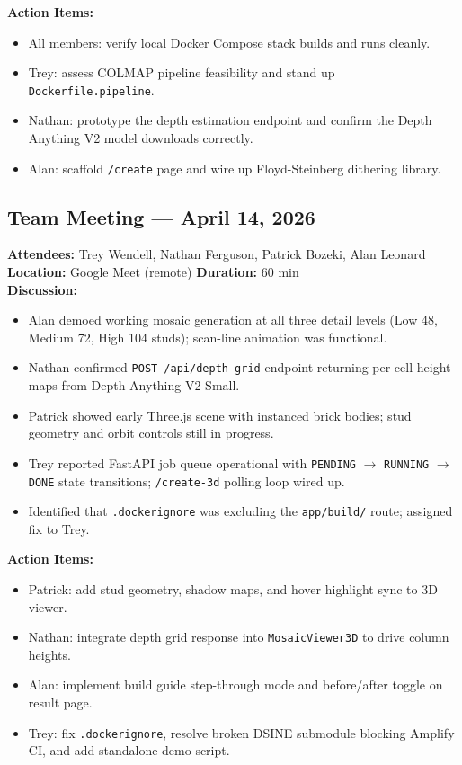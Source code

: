 \documentclass[12pt]{article}
\begin{document}
\textbf{Action Items:}
\begin{itemize}[leftmargin=*]
    \item All members: verify local Docker Compose stack builds and runs cleanly.
    \item Trey: assess COLMAP pipeline feasibility and stand up \texttt{Dockerfile.pipeline}.
    \item Nathan: prototype the depth estimation endpoint and confirm the Depth Anything V2 model downloads correctly.
    \item Alan: scaffold \texttt{/create} page and wire up Floyd-Steinberg dithering library.
\end{itemize}

\vspace{1em}
\subsection{Team Meeting --- April 14, 2026}

\textbf{Attendees:} Trey Wendell, Nathan Ferguson, Patrick Bozeki, Alan Leonard\\
\textbf{Location:} Google Meet (remote) \quad \textbf{Duration:} 60 min\\[0.5em]

\textbf{Discussion:}
\begin{itemize}[leftmargin=*]
    \item Alan demoed working mosaic generation at all three detail levels (Low 48, Medium 72, High 104 studs); scan-line animation was functional.
    \item Nathan confirmed \texttt{POST /api/depth-grid} endpoint returning per-cell height maps from Depth Anything V2 Small.
    \item Patrick showed early Three.js scene with instanced brick bodies; stud geometry and orbit controls still in progress.
    \item Trey reported FastAPI job queue operational with \texttt{PENDING} $\to$ \texttt{RUNNING} $\to$ \texttt{DONE} state transitions; \texttt{/create-3d} polling loop wired up.
    \item Identified that \texttt{.dockerignore} was excluding the \texttt{app/build/} route; assigned fix to Trey.
\end{itemize}

\textbf{Action Items:}
\begin{itemize}[leftmargin=*]
    \item Patrick: add stud geometry, shadow maps, and hover highlight sync to 3D viewer.
    \item Nathan: integrate depth grid response into \texttt{MosaicViewer3D} to drive column heights.
    \item Alan: implement build guide step-through mode and before/after toggle on result page.
    \item Trey: fix \texttt{.dockerignore}, resolve broken DSINE submodule blocking Amplify CI, and add standalone demo script.
\end{itemize}
\end{document}
